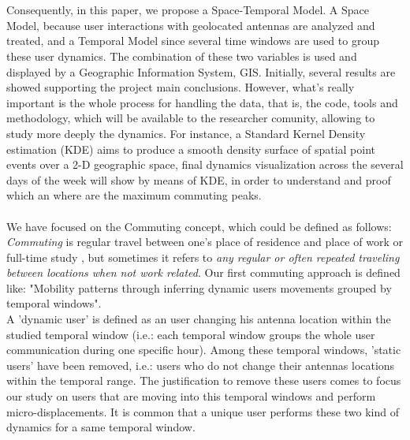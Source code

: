 \\
\\
Consequently, in this paper, we propose a Space-Temporal Model. A Space Model, because user interactions with geolocated antennas are analyzed and treated, and a Temporal Model since several time windows are used to group these user dynamics. The combination of these two variables is used and displayed by a Geographic Information System, GIS. Initially, several results are showed supporting the project main conclusions. However, what's really important is the whole process for handling the data, that is, the code, tools and methodology, which will be available to the researcher comunity, allowing to study more deeply the dynamics. For instance, a Standard Kernel Density estimation (KDE) aims to produce a smooth density surface of spatial point events over a 2-D geographic space\citep{SIM:SIM4780090616,5969036}, final dynamics visualization across the several days of the week will show by means of KDE, in order to understand and proof which an where are the maximum commuting peaks. 
\\
\\
We have focused on the Commuting concept, which could be defined as follows: \emph{Commuting} is regular travel between one's place of residence and place of work or full-time study \citep{wiki:commuting}, but  sometimes it refers to \emph{any regular or often repeated traveling between locations when not work related}. Our first commuting approach is defined like: "Mobility patterns through inferring dynamic users movements grouped by temporal windows". 
\\
A 'dynamic user' is defined as an user changing his antenna location within the studied temporal window (i.e.: each temporal window groups the whole user communication during one specific hour). Among these temporal windows, 'static users' have been removed, i.e.: users who do not change their antennas locations within the temporal range. The justification to remove these users comes to focus our study on users that are moving into this temporal windows and perform micro-displacements. It is common that a unique user performs these two kind of dynamics for a same temporal window.